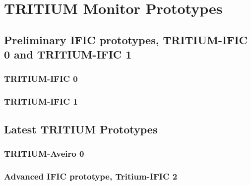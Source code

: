 \documentclass[12pt,a4paper]{book}
\begin{document}
\chapter{TRITIUM Monitor Prototypes}\label{chap:Prototypes}	
	
	
	\section[Preliminary Prototypes]{Preliminary IFIC prototypes, TRITIUM-IFIC 0 and TRITIUM-IFIC 1}\label{sec:Preliminary_prototypes}
	
		
		\subsection{TRITIUM-IFIC 0}\label{subsec:TritiumIFIC0}
		
		
		\subsection{TRITIUM-IFIC 1}\label{subsec:TritiumIFIC1}
		
				
	\section{Latest TRITIUM Prototypes}\label{sec:LatestTritiumPrototypes}
	
	
		\subsection{TRITIUM-Aveiro 0}\label{subsec:TritiumAveiro}
		
		
		\subsection[TRITIUM-IFIC 2]{Advanced IFIC prototype, Tritium-IFIC 2}\label{subsec:TritiumIFIC2}
		
		
\end{document}
